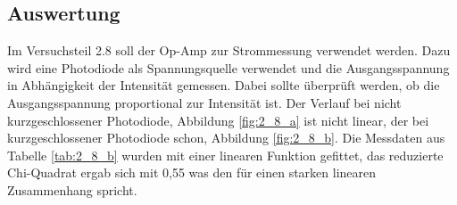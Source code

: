 \documentclass[12pt,a4paper]{article}
\begin{document}
\subsection{Auswertung}

Im Versuchsteil 2.8 soll der Op-Amp zur Strommessung verwendet werden. Dazu wird eine Photodiode als Spannungsquelle verwendet und die Ausgangsspannung in Abhängigkeit der Intensität gemessen. Dabei sollte überprüft werden, ob die Ausgangsspannung proportional zur Intensität ist. Der Verlauf bei nicht kurzgeschlossener Photodiode, Abbildung \ref{fig:2_8_a} ist nicht linear, der bei kurzgeschlossener Photodiode schon, Abbildung \ref{fig:2_8_b}. Die Messdaten aus Tabelle \ref{tab:2_8_b} wurden mit einer linearen Funktion gefittet, das reduzierte Chi-Quadrat ergab sich mit 0,55 was den für einen starken linearen Zusammenhang spricht.
\end{document}

